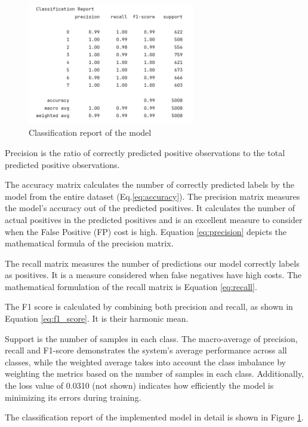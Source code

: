 \begin{figure}
	\centering
	\includegraphics[width = 0.65\textwidth]{images/classific_report.png}
	\caption{Classification report of the model}
	\label{fig:report}
\end{figure}


Precision is the ratio of correctly predicted positive observations to the total predicted positive observations. 

The accuracy matrix calculates the number of correctly predicted labels by the model from the entire dataset (Eq.\ref{eq:accuracy}). 
The precision matrix measures the model's accuracy out of the predicted positives. It calculates the number of actual positives in the predicted positives and is an excellent measure to consider when the False Positive (FP) cost is high. Equation \ref{eq:precision} depicts the mathematical formula of the precision matrix.

The recall matrix measures the number of predictions our model correctly labels as positives. It is a measure considered when false negatives have high costs. The mathematical formulation of the recall matrix is Equation \ref{eq:recall}. 

The F1 score is calculated by combining both precision and recall, as shown in Equation \ref{eq:f1_score}. It is their harmonic mean.

Support is the number of samples in each class. 
The macro-average of precision, recall and F1-score demonstrates the system's average performance across all classes, while the weighted average takes into account the class imbalance by weighting the metrics based on the number of samples in each class. Additionally, the loss value of 0.0310 (not shown) indicates how efficiently the model is minimizing its errors during training.

The classification report of the implemented model in detail is shown in Figure \ref{fig:report}. 


